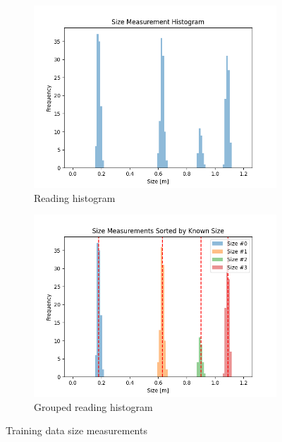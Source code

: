 \documentclass[12pt]{article}
\begin{document}
\begin{figure}[H]
    \centering
    \begin{subfigure}[b]{0.49\textwidth}
        \centering
        \includegraphics[width=\textwidth]{Problem 1/out/p1_size_hist.png}
        \caption{Reading histogram}
        \label{fig:p1-size-hist}
    \end{subfigure}
    \begin{subfigure}[b]{0.49\textwidth}
        \centering
        \includegraphics[width=\textwidth]{Problem 1/out/p1_sorted_size_hist.png}
        \caption{Grouped reading histogram}
        \label{fig:p1-sorted-size-hist}
    \end{subfigure}
    \caption{Training data size measurements}
    \label{fig:p1-size-hists}
\end{figure}
\end{document}
